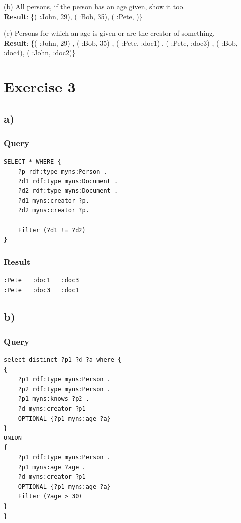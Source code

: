 \documentclass{article}
\begin{document}
(b) All persons, if the person has an age given, show it too.\\
\textbf{Result}: \{( :John, 29), ( :Bob, 35), ( :Pete, )\}\\
\vspace{0.3cm}

(c) Persons for which an age is given or are the creator of something.\\
\textbf{Result}: \{( :John, 29) , ( :Bob, 35) , ( :Pete, :doc1) , ( :Pete,
:doc3) , ( :Bob, :doc4), ( :John, :doc2)\}
\vspace{0.3cm}

\vspace{2cm}
\section*{Exercise 3}
\subsection*{a)}
\subsubsection*{Query}
\begin{lstlisting}
SELECT * WHERE {
	?p rdf:type myns:Person .
	?d1 rdf:type myns:Document .
	?d2 rdf:type myns:Document .
	?d1 myns:creator ?p.
	?d2 myns:creator ?p.
	
	Filter (?d1 != ?d2)
}
\end{lstlisting}
\subsubsection*{Result}
\begin{lstlisting}
:Pete	:doc1	:doc3
:Pete	:doc3	:doc1
\end{lstlisting}




\subsection*{b)}
\subsubsection*{Query}
\begin{lstlisting}
select distinct ?p1 ?d ?a where {
{
	?p1 rdf:type myns:Person .
	?p2 rdf:type myns:Person .
	?p1 myns:knows ?p2 .
	?d myns:creator ?p1
	OPTIONAL {?p1 myns:age ?a}
}
UNION
{
	?p1 rdf:type myns:Person .
	?p1 myns:age ?age .
	?d myns:creator ?p1
	OPTIONAL {?p1 myns:age ?a}
	Filter (?age > 30)
}
}
\end{lstlisting}
\end{document}

